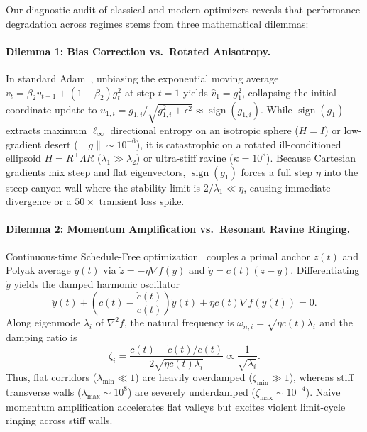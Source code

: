 \documentclass[10pt,twocolumn,letterpaper]{article}
\theoremstyle{definition}
\theoremstyle{remark}
\newcommand{\sign}{\operatorname{sign}}
\begin{document}
Our diagnostic audit of classical and modern optimizers reveals that performance degradation across regimes stems from three mathematical dilemmas:

\paragraph{Dilemma 1: Bias Correction vs.\ Rotated Anisotropy.}
In standard Adam~\cite{kingma2015adam}, unbiasing the exponential moving average $v_t = \beta_2 v_{t-1} + (1-\beta_2)g_t^2$ at step $t=1$ yields $\hat{v}_1 = g_1^2$, collapsing the initial coordinate update to $u_{1,i} = g_{1,i}/\sqrt{g_{1,i}^2 + \epsilon^2} \approx \sign(g_{1,i})$. While $\sign(g_1)$ extracts maximum $\ell_\infty$ directional entropy on an isotropic sphere ($H = I$) or low-gradient desert ($\|g\| \sim 10^{-6}$), it is catastrophic on a rotated ill-conditioned ellipsoid $H = R^\top \Lambda R$ ($\lambda_1 \gg \lambda_2$) or ultra-stiff ravine ($\kappa = 10^8$). Because Cartesian gradients mix steep and flat eigenvectors, $\sign(g_1)$ forces a full step $\eta$ into the steep canyon wall where the stability limit is $2/\lambda_1 \ll \eta$, causing immediate divergence or a $50\times$ transient loss spike.

\paragraph{Dilemma 2: Momentum Amplification vs.\ Resonant Ravine Ringing.}
Continuous-time Schedule-Free optimization~\cite{defazio2024road} couples a primal anchor $z(t)$ and Polyak average $y(t)$ via $\dot{z} = -\eta \nabla f(y)$ and $\dot{y} = c(t)(z - y)$. Differentiating $\dot{y}$ yields the damped harmonic oscillator
\begin{equation}
  \ddot{y}(t) + \left(c(t) - \frac{\dot{c}(t)}{c(t)}\right)\dot{y}(t) + \eta c(t)\nabla f(y(t)) = 0.
  \label{eq:primal_dual_ode}
\end{equation}
Along eigenmode $\lambda_i$ of $\nabla^2 f$, the natural frequency is $\omega_{n,i} = \sqrt{\eta c(t)\lambda_i}$ and the damping ratio is
\begin{equation}
  \zeta_i = \frac{c(t) - \dot{c}(t)/c(t)}{2\sqrt{\eta c(t)\lambda_i}} \propto \frac{1}{\sqrt{\lambda_i}}.
  \label{eq:damping_ratio}
\end{equation}
Thus, flat corridors ($\lambda_{\min} \ll 1$) are heavily overdamped ($\zeta_{\min} \gg 1$), whereas stiff transverse walls ($\lambda_{\max} \sim 10^8$) are severely underdamped ($\zeta_{\max} \sim 10^{-4}$). Naive momentum amplification accelerates flat valleys but excites violent limit-cycle ringing across stiff walls.
\end{document}
